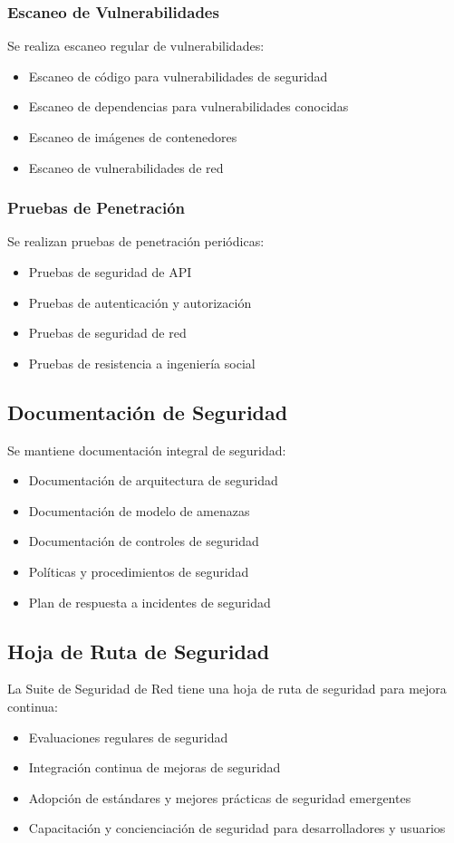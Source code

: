 \subsubsection{Escaneo de Vulnerabilidades}
Se realiza escaneo regular de vulnerabilidades:

\begin{itemize}
    \item Escaneo de código para vulnerabilidades de seguridad
    \item Escaneo de dependencias para vulnerabilidades conocidas
    \item Escaneo de imágenes de contenedores
    \item Escaneo de vulnerabilidades de red
\end{itemize}

\subsubsection{Pruebas de Penetración}
Se realizan pruebas de penetración periódicas:

\begin{itemize}
    \item Pruebas de seguridad de API
    \item Pruebas de autenticación y autorización
    \item Pruebas de seguridad de red
    \item Pruebas de resistencia a ingeniería social
\end{itemize}

\subsection{Documentación de Seguridad}
Se mantiene documentación integral de seguridad:

\begin{itemize}
    \item Documentación de arquitectura de seguridad
    \item Documentación de modelo de amenazas
    \item Documentación de controles de seguridad
    \item Políticas y procedimientos de seguridad
    \item Plan de respuesta a incidentes de seguridad
\end{itemize}

\subsection{Hoja de Ruta de Seguridad}
La Suite de Seguridad de Red tiene una hoja de ruta de seguridad para mejora continua:

\begin{itemize}
    \item Evaluaciones regulares de seguridad
    \item Integración continua de mejoras de seguridad
    \item Adopción de estándares y mejores prácticas de seguridad emergentes
    \item Capacitación y concienciación de seguridad para desarrolladores y usuarios
\end{itemize}